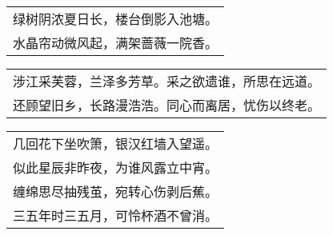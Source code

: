 \nopagebreak%
\nopagebreak%
\noindent\begin{minipage}{\linewidth}
  \vskip-3pt\begin{table}[H]
    \centering
    \begin{tabular}{@{}l@{}}
绿树阴浓夏日长，楼台倒影入池塘。\\
水晶帘动微风起，满架蔷薇一院香。
    \end{tabular}
  \end{table}
\end{minipage}
\vspace{1cm}


\nopagebreak%
\nopagebreak%
\noindent\begin{minipage}{\linewidth}
  \vskip-3pt\begin{table}[H]
    \centering
    \begin{tabular}{@{}l@{}}
涉江采芙蓉，兰泽多芳草。采之欲遗谁，所思在远道。\\
还顾望旧乡，长路漫浩浩。同心而离居，忧伤以终老。
    \end{tabular}
  \end{table}
\end{minipage}
\vspace{1cm}


\nopagebreak%
\nopagebreak%
\noindent\begin{minipage}{\linewidth}
  \vskip-3pt\begin{table}[H]
    \centering
    \begin{tabular}{@{}l@{}}
几回花下坐吹箫，银汉红墙入望遥。\\
似此星辰非昨夜，为谁风露立中宵。\\
缠绵思尽抽残茧，宛转心伤剥后蕉。\\
三五年时三五月，可怜杯酒不曾消。
    \end{tabular}
  \end{table}
\end{minipage}
\vspace{1cm}


